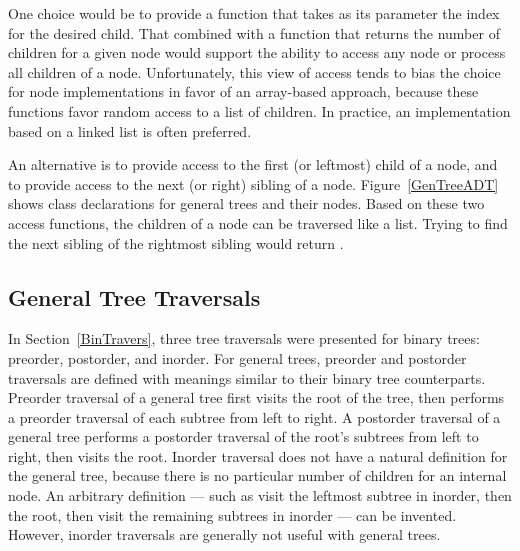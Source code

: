 One choice would be to provide a function that takes as its parameter
the index for the desired child.
That combined with a function that returns the number of children for
a given node would support the ability to access any node or process
all children of a node.
Unfortunately, this view of access tends to bias the
choice for node implementations in favor of an array-based approach,
because these functions favor random access to a list of children.
In practice, an implementation based on a linked list is often
preferred.

An alternative is to provide access to the first (or leftmost) child
of a node, and to provide access to the next (or right) sibling of a
node.
Figure~\ref{GenTreeADT} shows class declarations for general trees and 
their nodes.
Based on these two access functions, the children of a node can be
traversed like a list.
Trying to find the next sibling of the rightmost sibling would return
\NULL.

\begin{figure}

\bigskip
{}

\vspace{-\bigskipamount}


\end{figure}

\subsection{General Tree Traversals}
\label{GenTraverse}

In Section~\ref{BinTravers}, three tree traversals were presented for
binary trees: preorder, postorder, and inorder.
For general trees, preorder and postorder traversals are defined with
meanings similar to their binary tree
counterparts.
Preorder traversal of a general tree first visits the root of the
tree, then performs a preorder traversal of each subtree from left to
right.
A postorder traversal of a general tree performs a postorder traversal
of the root's subtrees from left to right, then visits the root.
Inorder traversal does not have a natural definition for the
general tree, because there is no particular number of children for an
internal node.
An arbitrary definition --- such as visit the leftmost subtree in
inorder, then the root, then visit the remaining subtrees in inorder
--- can be invented.
However, inorder traversals are generally not useful with
general trees.

